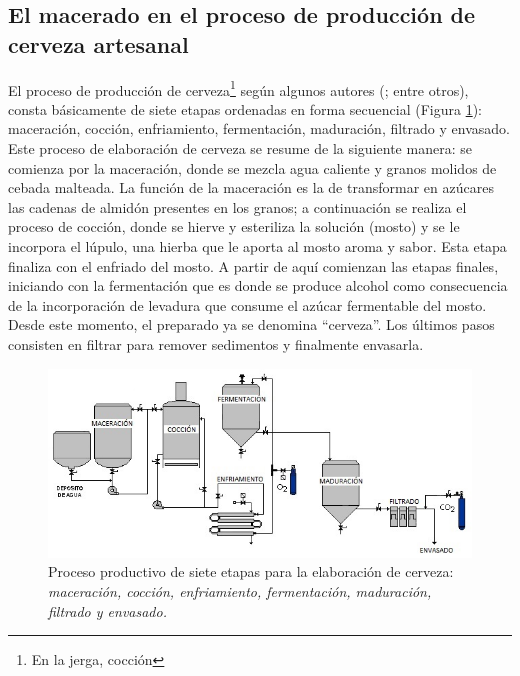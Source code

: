     \subsection{El macerado en el proceso de producción de cerveza artesanal}
    \par
    El proceso de producción de cerveza\footnote{En la jerga, cocción} según algunos autores (\cite{Dummies08,DogBrewery,AmericanHomeBrewers18, Novozymes13}; entre otros), consta básicamente de siete etapas ordenadas en forma secuencial (Figura \ref{ProcFab}): maceración, cocción, enfriamiento, fermentación, maduración, filtrado y envasado. Este proceso de elaboración de cerveza se resume de la siguiente manera: se comienza por la maceración, donde se mezcla agua caliente y granos molidos de cebada malteada. La función de la maceración es la de transformar en azúcares las cadenas de almidón presentes en los granos; a continuación se realiza el proceso de cocción, donde se hierve y esteriliza la solución (mosto) y se le incorpora el lúpulo, una hierba que le aporta al mosto aroma y sabor. Esta etapa finaliza con el enfriado del mosto. A partir de aquí comienzan las etapas finales, iniciando con la fermentación que es donde se produce alcohol como consecuencia de la incorporación de levadura que consume el azúcar fermentable del mosto. Desde este momento, el preparado ya se denomina ``cerveza''. Los últimos pasos consisten en filtrar para remover sedimentos y finalmente envasarla.
 
    \begin{figure}[h]
		\centerline{\includegraphics[scale=0.75]{introduccion/Etapasdelproceso.jpg}}
		\caption{Proceso productivo de siete etapas para la elaboración de cerveza: \textit{maceración, cocción, enfriamiento, fermentación, maduración, filtrado y envasado.}}
	    \label{ProcFab}
	\end{figure}
	
